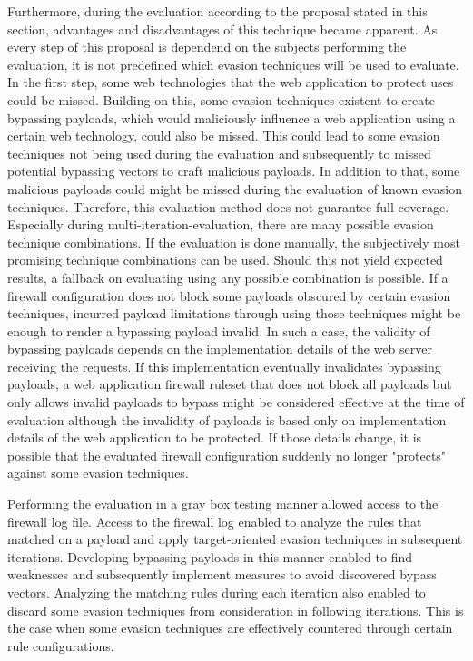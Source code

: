Furthermore, during the evaluation according to the proposal stated in this section, advantages and disadvantages of this technique became apparent. As every step of this proposal is dependend on the subjects performing the evaluation, it is not predefined which evasion techniques will be used to evaluate. In the first step, some web technologies that the web application to protect uses could be missed. Building on this, some evasion techniques existent to create bypassing payloads, which would maliciously influence a web application using a certain web technology, could also be missed. 
This could lead to some evasion techniques not being used during the evaluation and subsequently to missed potential bypassing vectors to craft malicious payloads. In addition to that, some malicious payloads could might be missed during the evaluation of known evasion techniques. 
Therefore, this evaluation method does not guarantee full coverage. 
Especially during multi-iteration-evaluation, there are many possible evasion technique combinations. If the evaluation is done manually, the subjectively most promising technique combinations can be used. Should this not yield expected results, a fallback on evaluating using any possible combination is possible.
If a firewall configuration does not block some payloads obscured by certain evasion techniques, incurred payload limitations through using those techniques might be enough to render a bypassing payload invalid. In such a case, the validity of bypassing payloads depends on the implementation details of the web server receiving the requests. 
If this implementation eventually invalidates bypassing payloads, a web application firewall ruleset that does not block all payloads but only allows invalid payloads to bypass might be considered effective at the time of evaluation although the invalidity of payloads is based only on implementation details of the web application to be protected. 
If those details change, it is possible that the evaluated firewall configuration suddenly no longer "protects" against some evasion techniques.

Performing the evaluation in a gray box testing manner allowed access to the firewall log file. Access to the firewall log enabled to analyze the rules that matched on a payload and apply target-oriented evasion techniques in subsequent iterations. Developing bypassing payloads in this manner enabled to find weaknesses and subsequently implement measures to avoid discovered bypass vectors. Analyzing the matching rules during each iteration also enabled to discard some evasion techniques from consideration in following iterations. This is the case when some evasion techniques are effectively countered through certain rule configurations. 

